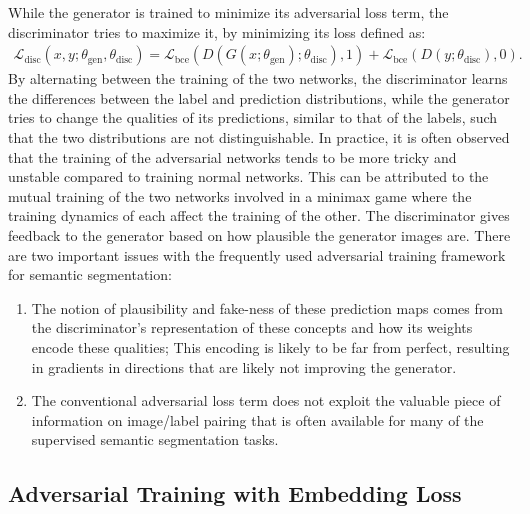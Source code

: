 \documentclass{article} \usepackage{nips13submit_e,times}
\begin{document}
While the generator is trained to minimize its adversarial loss term, the discriminator tries to maximize it, by minimizing its loss defined as:
\begin{align}
\mathcal{L}_\text{disc}(x, y; \theta_\text{gen}, \theta_\text{disc}) = \mathcal{L}_\text{bce}(D(G(x; \theta_\text{gen}); \theta_\text{disc}), 1) + \mathcal{L}_\text{bce}(D(y; \theta_\text{disc}), 0).
\label{eq:ldisc_ce}
\end{align}
By alternating between the training of the two networks, the discriminator learns the differences between the label and prediction distributions, while the generator tries to change the qualities of its predictions, similar to that of the labels, such that the two distributions are not distinguishable.
In practice, it is often observed that the training of the adversarial networks tends to be more tricky and unstable compared to training normal networks.
This can be attributed to the mutual training of the two networks involved in a minimax game where the training dynamics of each affect the training of the other.
The discriminator gives feedback to the generator based on how plausible the generator images are.
There are two important issues with the frequently used adversarial training framework for semantic segmentation:
\begin{enumerate}
  \item
  The notion of plausibility and fake-ness of these prediction maps comes from the discriminator's representation of these concepts and how its weights encode these qualities;
  This encoding is likely to be far from perfect, resulting in gradients in directions that are likely not improving the generator.
  \item
  The conventional adversarial loss term does not exploit the valuable piece of information on image/label pairing that is often available for many of the supervised semantic segmentation tasks.
\end{enumerate}



\subsection{Adversarial Training with Embedding Loss}
\end{document}
